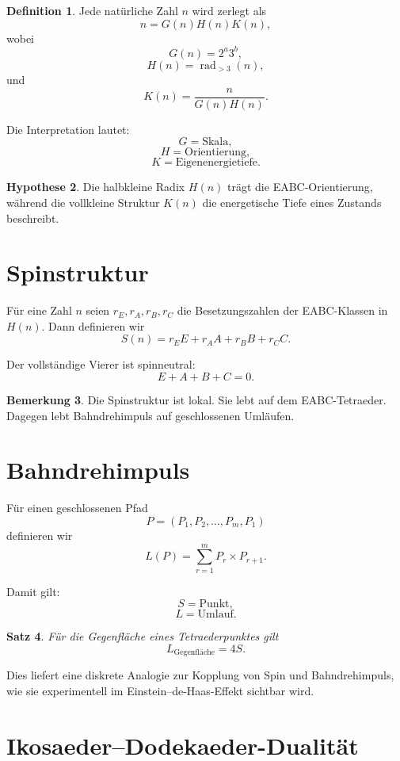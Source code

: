\documentclass[11pt,a4paper]{article}
\newtheorem{satz}{Satz}[section]
\theoremstyle{definition}
\newtheorem{definition}[satz]{Definition}
\newtheorem{hypothese}[satz]{Hypothese}
\newtheorem{bemerkung}[satz]{Bemerkung}
\begin{document}
	\begin{definition}
		Jede natürliche Zahl \(n\) wird zerlegt als
		\[
		n=G(n)H(n)K(n),
		\]
		wobei
		\[
		G(n)=2^a3^b,
		\]
		\[
		H(n)=\operatorname{rad}_{>3}(n),
		\]
		und
		\[
		K(n)=\frac{n}{G(n)H(n)}.
		\]
	\end{definition}
	
	Die Interpretation lautet:
	\[
	G=\text{Skala},
	\]
	\[
	H=\text{Orientierung},
	\]
	\[
	K=\text{Eigenenergietiefe}.
	\]
	
	\begin{hypothese}
		Die halbkleine Radix \(H(n)\) trägt die EABC-Orientierung, während die vollkleine Struktur \(K(n)\) die energetische Tiefe eines Zustands beschreibt.
	\end{hypothese}
	
	\section{Spinstruktur}
	
	Für eine Zahl \(n\) seien \(r_E,r_A,r_B,r_C\) die Besetzungszahlen der EABC-Klassen in \(H(n)\). Dann definieren wir
	\[
	S(n)=r_EE+r_AA+r_BB+r_CC.
	\]
	
	Der vollständige Vierer ist spinneutral:
	\[
	E+A+B+C=0.
	\]
	
	\begin{bemerkung}
		Die Spinstruktur ist lokal. Sie lebt auf dem EABC-Tetraeder. Dagegen lebt Bahndrehimpuls auf geschlossenen Umläufen.
	\end{bemerkung}
	
	\section{Bahndrehimpuls}
	
	Für einen geschlossenen Pfad
	\[
	P=(P_1,P_2,\ldots,P_m,P_1)
	\]
	definieren wir
	\[
	L(P)=\sum_{r=1}^{m}P_r\times P_{r+1}.
	\]
	
	Damit gilt:
	\[
	S=\text{Punkt},
	\]
	\[
	L=\text{Umlauf}.
	\]
	
	\begin{satz}
		Für die Gegenfläche eines Tetraederpunktes gilt
		\[
		L_{\mathrm{Gegenfläche}}=4S.
		\]
	\end{satz}
	
	Dies liefert eine diskrete Analogie zur Kopplung von Spin und Bahndrehimpuls, wie sie experimentell im Einstein--de-Haas-Effekt sichtbar wird.
	
	\section{Ikosaeder--Dodekaeder-Dualität}
	
\end{document}
